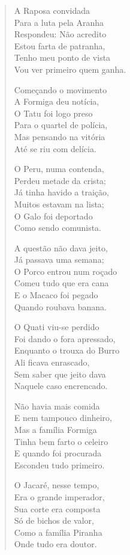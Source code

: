 \begin{verse}
A Raposa convidada\\
Para a luta pela Aranha\\
Respondeu: Não acredito\\
Estou farta de patranha,\\
Tenho meu ponto de vista\\
Vou ver primeiro quem ganha.

Começando o movimento\\
A Formiga deu notícia,\\
O Tatu foi logo preso\\
Para o quartel de polícia,\\
Mas pensando na vitória\\
Até se riu com delícia.

O Peru, numa contenda,\\
Perdeu metade da crista;\\
Já tinha havido a traição,\\
Muitos estavam na lista;\\
O Galo foi deportado\\
Como sendo comunista.


A questão não dava jeito,\\
Já passava uma semana;\\
O Porco entrou num roçado\\
Comeu tudo que era cana\\
E o Macaco foi pegado\\
Quando roubava banana.

O Quati viu-se perdido\\
Foi dando o fora apressado,\\
Enquanto o trouxa do Burro\\
Ali ficava enrascado,\\
Sem saber que jeito dava\\
Naquele caso encrencado.

Não havia mais comida\\
E nem tampouco dinheiro,\\
Mas a família Formiga\\
Tinha bem farto o celeiro\\
E quando foi procurada\\
Escondeu tudo primeiro.

O Jacaré, nesse tempo,\\
Era o grande imperador,\\
Sua corte era composta\\
Só de bichos de valor,\\
Como a família Piranha\\
Onde tudo era doutor.



\end{verse}
